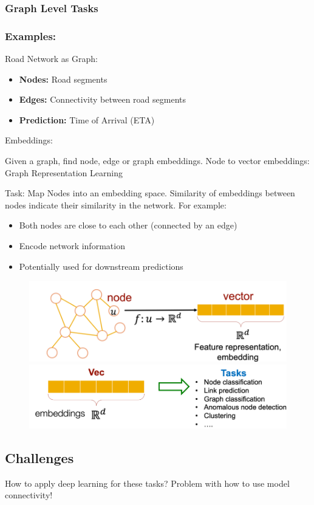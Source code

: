 \subsubsection{Graph Level Tasks}
\subsubsection*{Examples:}
Road Network as Graph:
\begin{itemize}
    \item \textbf{Nodes:} Road segments
    \item \textbf{Edges:} Connectivity between road segments
    \item \textbf{Prediction:} Time of Arrival (ETA)
\end{itemize}
Embeddings:

Given a graph, find node, edge or graph embeddings.
Node to vector embeddings: Graph Representation Learning

Task: Map Nodes into an embedding space.
Similarity of embeddings between nodes indicate their similarity in the network. For example:
\begin{itemize}
    \item Both nodes are close to each other (connected by an edge)
    \item Encode network information
    \item Potentially used for downstream predictions
\end{itemize}
\begin{figure}[!h]
    \includegraphics[width = 0.45\columnwidth]{figures/GraphNeuralNetworks1/GraphEmbedding1.png}
    \includegraphics[width = 0.5\columnwidth]{figures/GraphNeuralNetworks1/GraphEmbedding2.png}
\end{figure}

\subsection{Challenges}
How to apply deep learning for these tasks?
Problem with how to use model connectivity!

